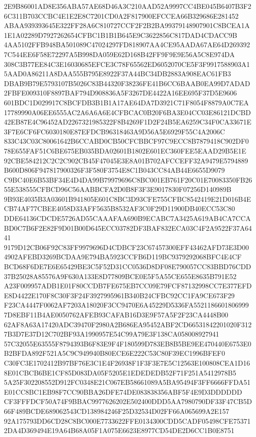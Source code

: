\documentclass[UTF8,fontset=fandol,zihao=-4,a4paper]{ctexart}
\begin{document}
{{2E9B86001AD8E356ABA57AE68D46A3C210AAD52A9997CC4BE045B6407B3F26C311B703CCBC4E1E2E8C7201CD0A2F817900EFCCEA66B329686E281452
ABAA939393645E322FF28A6C810727CCF2F2B2BA99379148907901C8BCEA1A1E1A02289D7927262654CFBC1B1B1B645E9C3622856C817DAD4CDACC9B
4AA5102FFB948BA501089C47024297FD818907AA4CE95AADA67AE64D2693927C544EE6F58E72297A5B998DA059E62D168B42FF9F9E9E56A5C8E974DA
308C3B77EE84C3E16030685EFCE3C78F65562ED6052070CE5F3F9917588903A15AAD0A86211A8DAA555B795E8922F37A44BC34DB2883A908EAC61FB3
DBAB9B79E5793107B5026C83B44320F38236FE41B6CC6BAAB0EA99D7ADAD2FBFE009310F8897BAF794D908836A5F3267DE4422A16EE695F37D5E9606
601BDC1D029917C8BCFDB3B1B1A17AE64DA7D3921C71F8054F8879A0C7EA17789990A06EE6555AC2A6A6A6E4CFBCAC0B20F6BA3E04CC03E86121DCBD
42EB87E4C96452AD2267321985322F8B4269F1D2F24B5EA6259C34F0CA33671E3F7E6CF6FC6030180E87EFDCB96318463A9D56A5E6929F55C4A2006C
833C43C03C80061642B6CCABD0CB50CFCBBCF97C9ECC8B7879418C902DF078E655FAF51C6BE675EB035BDA02601B1802E601EC360FEE5EAAD29B5E1E
92CBE584212C2C2C902CB45F47045E3E8A01B702AFCCEFF32A9479E5794889B600D806F947817900326F3F580F3754E8C1B043CC84AB44E6655D9079
C9BC40E6B53BF34E4D4DA99B79979696C8BC001EB761F20C01E70083350FB2655E538555CFBCD96C56AABBCFA2D0B8F3F3E9017830F07256D140989B
9B93E4035B3A03601B941805E601C8BC3D93CFE755CFBC8542419E21D016B4ECB74AF77CBEE4058D33AFF5635B8532AF3C0F29D11900DB40ECC53C80
DDE64136CDCDE5726AD55CAAAFAA690B9ECABC7A3425A619AB4CA7CCABD0C7B6F2E82F9D01B00D645ECC03782DF3BAF832ECA03C4F2A9522F37A6441
9179D12CB06F92C83FF9979696D4CDBCF23C67457300EFF43462AFD73E3D004902AFEBD3269BCDAA9E794BA5923CCFB6D119BC9379292068BFC4E4CF
BCD68F6DE7E6E65429BE3C5F52D31CC0536D8DF08E790057CC83BBD76CDD37B25028A85576A9F630A133E8D77809BCE0E5F5A55CE655E8635B791E52
A23F009957ADB1E01F80CCDB7FE675EB7CC09E79FCF87132998CC7E377EFDE8D4422E170F8C30F3F24F3927995961B340B24CFBC92CC1FA9CE673F29
F23CA4447F0062AF7203A18020F3CC9470E6A45229D5336FA55211866018069997D8EBF11B4AE0050762AFEB93CAFAB16D3E9F57A5F2F23CA4448B00
62AF8A63A17420ADC39470F2980A2B686EA95452ABF2CD66531842201020F3127B3D7E37D12C702BF93A1990957E54C99A79E3F138CA058008927941
57C32055E63555F8794393B6F83E9F4F180599D783EB8B5BE9EE470440E6753E0B2BFDA892F521A5C9C949940B80ECE6E222C53C80F39EC1996BFEF0
C30FC3E1702412B97BF76E3C1E4F26938F1F3F3E7E5C12563E100808CEA1D168E01CBCB6BE1CF85D083DA05F5205E1EDEDEDB52F71F251A5412978B5
5A25F302208552D912FC0348E21C067EB58661089A5BA95494F3FF6666FFDA51E01CC8BC1EB98F7CC90BBA26DFE74DE083838356ABF5F4E9D3DDDDDD
CF3FFFDCF50A74F9BBAC9977626202E502400DDD5AA7980790DF33F47CB5D66F489BCDE689062543CD138984246F25D32534D02FF66A065699A2E157
92A175793DD6CD28C8BC000E7733622FFE0134300CDD5CADF05498CFE753712DA4D369494E19A64B68A05F1A075E6623E8977CD54DE2D6CC1B0E8751
}}
\end{document}
